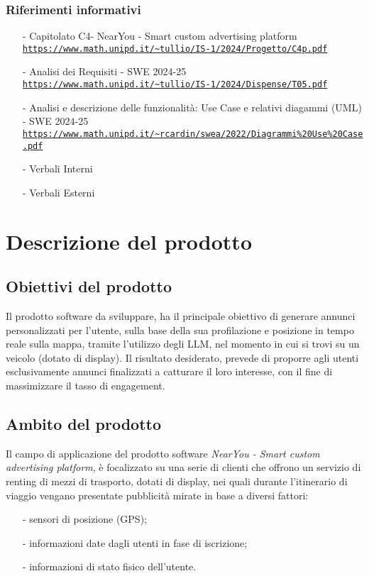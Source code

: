 \documentclass[11pt]{article}
\begin{document}
\begin{justify}
\subsubsection{Riferimenti informativi}
\begin{itemize}
    \item[-] Capitolato C4- NearYou - 
Smart custom advertising platform\\
    \textcolor{blue}{\texttt{\url{https://www.math.unipd.it/~tullio/IS-1/2024/Progetto/C4p.pdf}}}
    \item[-] Analisi dei Requisiti - SWE 2024-25\\
    \textcolor{blue}{\texttt{\url{https://www.math.unipd.it/~tullio/IS-1/2024/Dispense/T05.pdf}}}
    \item[-] Analisi e descrizione delle funzionalità: Use Case e relativi diagammi (UML) - SWE 2024-25\\    
    \textcolor{blue}{\texttt{\url{https://www.math.unipd.it/~rcardin/swea/2022/Diagrammi\%20Use\%20Case.pdf}}}
    \item[-] Verbali Interni
    \item[-] Verbali Esterni
    
\end{itemize}

\newpage
\section{Descrizione del prodotto}
\label{sec:descrizione}
\subsection{Obiettivi del prodotto}
Il prodotto software da sviluppare, ha il principale obiettivo di generare annunci personalizzati per l'utente, sulla base della sua profilazione e posizione in tempo reale sulla mappa, tramite l'utilizzo degli LLM, nel momento in cui si trovi su un veicolo (dotato di display). Il risultato desiderato, prevede di proporre agli utenti esclusivamente annunci finalizzati a catturare il loro interesse, con il fine di massimizzare il tasso di engagement.

\subsection{Ambito del prodotto}
Il campo di applicazione del prodotto software \textit{NearYou - 
Smart custom advertising platform}, è focalizzato su una serie di clienti che offrono un servizio di renting di mezzi di trasporto, dotati di display, nei quali durante l'itinerario di viaggio vengano presentate pubblicità mirate in base a diversi fattori:
\begin{itemize}
    \item [-] sensori di posizione (GPS);
    \item [-] informazioni date dagli utenti in fase di iscrizione;
    \item [-] informazioni di stato fisico dell’utente.
\end{itemize}


\end{justify}
\end{document}
